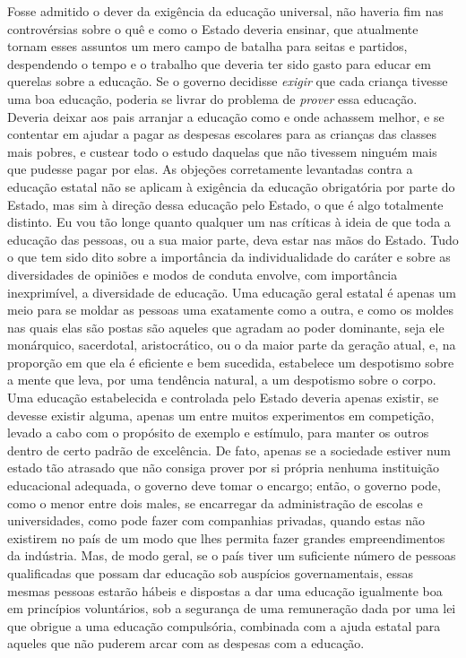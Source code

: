 Fosse admitido o dever da exigência da educação universal, não haveria
fim nas controvérsias sobre o quê e como o Estado deveria ensinar, que
atualmente tornam esses assuntos um mero campo de batalha para seitas
e partidos, despendendo o tempo e o trabalho que deveria ter sido
gasto para educar em querelas sobre a educação. Se o governo
decidisse \textit{exigir} que cada criança tivesse uma boa educação,
poderia se livrar do problema de \textit{prover} essa
educação. Deveria deixar aos pais arranjar a educação como e
onde achassem melhor, e se contentar em ajudar a pagar as
despesas escolares para as crianças das classes mais pobres, e custear
todo o estudo daquelas que não tivessem ninguém mais que pudesse pagar
por elas. As objeções corretamente levantadas contra a educação estatal
não se aplicam à exigência da educação obrigatória por parte do Estado,
mas sim à direção dessa educação pelo Estado, o que é algo totalmente
distinto. Eu vou tão longe quanto qualquer um nas
críticas à ideia de que toda a educação das pessoas, ou a sua maior parte, deva
estar nas mãos do Estado. Tudo o que tem sido dito sobre a importância da
individualidade do caráter e sobre as diversidades de opiniões e modos
de conduta envolve, com importância inexprimível, a
diversidade de educação. Uma educação geral estatal é apenas um meio
para se moldar as pessoas uma exatamente como a outra, e como os moldes
nas quais elas são postas são aqueles que agradam ao poder dominante,
seja ele monárquico, sacerdotal, aristocrático, ou o da maior parte da
geração atual, e, na proporção em que ela é eficiente e bem sucedida,
estabelece um despotismo sobre a mente que leva, por uma tendência
natural, a um despotismo sobre o corpo. Uma educação estabelecida e controlada
pelo Estado deveria apenas existir, se devesse existir alguma, apenas
um entre muitos experimentos em competição, levado a cabo com o
propósito de exemplo e estímulo, para manter os outros dentro de certo
padrão de excelência. De fato, apenas se a sociedade estiver num estado
tão atrasado que não consiga prover por si própria nenhuma instituição
educacional adequada, o governo deve tomar o encargo; então, o governo
pode, como o menor entre dois males, se encarregar da administração de
escolas e universidades, como pode fazer com companhias
privadas, quando estas não existirem no país de um modo que lhes
permita fazer grandes empreendimentos da indústria. Mas, de modo geral,
se o país tiver um suficiente número de pessoas qualificadas que possam
dar educação sob auspícios governamentais, essas mesmas pessoas estarão
hábeis e dispostas a dar uma educação igualmente boa em princípios
voluntários, sob a segurança de uma remuneração dada por uma lei que
obrigue a uma educação compulsória, combinada com a ajuda estatal para
aqueles que não puderem arcar com as despesas com a educação.

